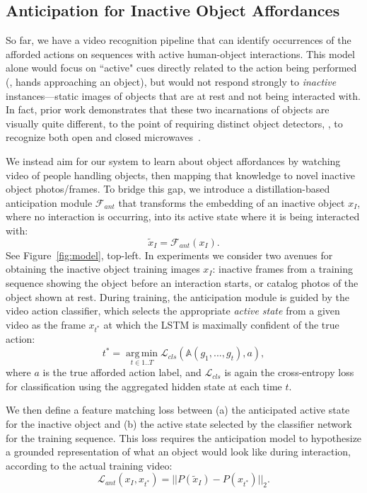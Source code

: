\documentclass[10pt,twocolumn,letterpaper]{article}
\newcommand{\reffig}[1]{Figure~\ref{#1}}
\begin{document}
\subsection{Anticipation for Inactive Object Affordances}\label{sec:distill}

So far, we have a video recognition pipeline that can identify occurrences of the afforded actions on sequences with active human-object interactions.
This model alone would focus on ``active" cues directly related to the action being performed (\eg, hands approaching an object), but would not respond strongly to \emph{inactive} instances---static images of objects that are at rest and not being interacted with. 
In fact, prior work demonstrates that these two incarnations of objects are visually quite different, to the point of requiring distinct object detectors, \eg, to recognize both open and closed microwaves~\cite{deva-adl-2012}.

We instead aim for our system to learn about object affordances by watching video of people handling objects, then mapping that knowledge to novel inactive object photos/frames. 
To bridge this gap, we introduce a distillation-based anticipation module $\mathcal{F}_{ant}$ that transforms the embedding of an inactive object $x_I$, where no interaction is occurring, into its active state where it is being interacted with:
\begin{equation}
    \widetilde{x}_I = \mathcal{F}_{ant}(x_I).
\end{equation} 
See \reffig{fig:model}, top-left.
In experiments we consider two avenues for obtaining the inactive object training images $x_I$: inactive frames from a training sequence showing the object before an interaction starts, or catalog photos of the object shown at rest.
During training, the anticipation module is guided by the video action classifier, which selects the appropriate \emph{active state} from a given video as the frame $x_{t^*}$ at which the LSTM is maximally confident of the true action: 
\begin{equation}
   t^* = \operatorname*{arg\,min}_{t \in 1..T} \mathcal{L}_{cls}(\mathbb{A}(g_1, ..., g_t), a),
\end{equation}
where $a$ is the true afforded action label, and $\mathcal{L}_{cls}$ is again the cross-entropy loss for classification using the aggregated hidden state at each time $t$.

We then define a feature matching loss between (a) the anticipated active state for the inactive object and (b) the active state selected by the classifier network for the training sequence. This loss requires the anticipation model to hypothesize a grounded representation of what an object would look like during interaction, according to the actual training video:
\begin{equation} \label{eqn:anticipation}
   \mathcal{L}_{ant}(x_I, x_{t^*}) = ||P(\widetilde{x}_I) - P(x_{t^*}) ||_2.
\end{equation}
\end{document}
